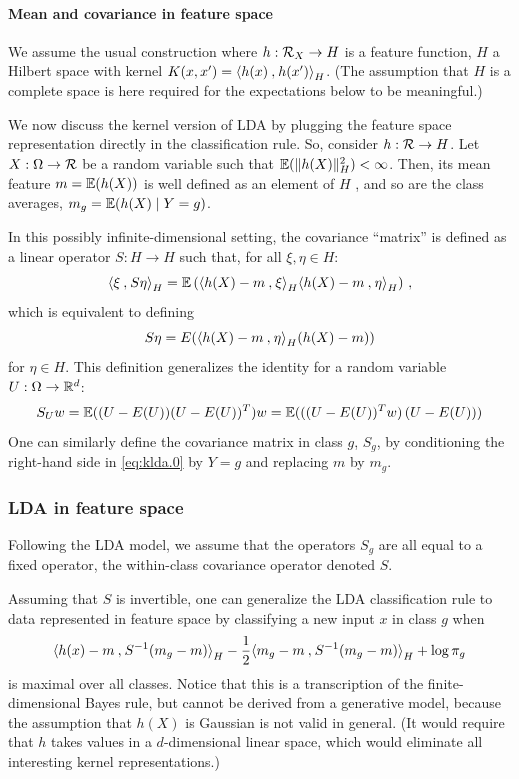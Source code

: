 \paragraph{Mean and covariance in feature space}
We assume the usual construction where $h: {\mathcal R}_X \to H$ is a feature function, $H$ a {Hilbert} space with kernel $K(x,x') = {\langle {h(x)}\mathbin{,} {h(x')}\rangle}_H$. (The assumption that $H$ is a complete space is here required for the expectations below to be meaningful.)

We now discuss the kernel version of LDA by plugging the feature space representation directly in the classification rule. So, consider $h: {\mathcal R} \to H$. Let $X:\Omega \to {\mathcal R}$ be a random variable such that $\bm{\mathbb E}(\|h(X)\|_H^2) < \infty$. Then, its mean feature $m = \bm{\mathbb E}(h(X))$ is well defined as an element of $H$ , and so are the class averages, $m_g = \bm{\mathbb E}(h(X)\mid Y=g)$. 

In this possibly infinite-dimensional setting, 
the covariance ``matrix'' is  defined as a linear operator $S: H\to H$ such that, for all $\xi, \eta\in H$:
\begin{equation}
\label{eq:klda.0}
{\langle {\xi}\mathbin{,} {S\eta}\rangle}_H = \bm{\mathbb E}\left({\langle {h(X)-m}\mathbin{,} {\xi}\rangle}_H{\langle {h(X)-m}\mathbin{,} {\eta}\rangle}_H\right)\,,
\end{equation}
which is equivalent to defining 
\[
S\eta = E({\langle {h(X)-m}\mathbin{,} {\eta}\rangle}_H (h(X) - m))
\] 
for $\eta\in H$.  This definition generalizes the identity for a random variable $U: \Omega\to {\mathbb{R}}^d$:
\[
S_U w = \bm{\mathbb E}((U-E(U))(U-E(U))^T) w = \bm{\mathbb E}(((U-E(U))^Tw)\,(U-E(U))) 
\]
One can similarly define the covariance matrix in class $g$, $S_g$, by conditioning the right-hand side in \cref{eq:klda.0} by $Y=g$ and replacing $m$ by $m_g$. 
\bigskip


\subsubsection*{LDA in feature space}
Following the LDA model, we assume that the operators $S_g$ are all equal to a fixed operator, the within-class  covariance operator denoted $S$.

Assuming that $S$ is invertible, one can generalize the LDA classification rule to data represented in feature space   by classifying a new input $x$ in class $g$ when 
\begin{equation}
\label{eq:klda.1}
{\langle {h(x)- m}\mathbin{,} { S^{-1} (m_g - m)}\rangle}_H - \frac12 {\langle {m_g - m}\mathbin{,} {S^{-1} (m_g- m)}\rangle}_H +  \log\pi_g
\end{equation}
is maximal over all classes. Notice that this is a transcription of the finite-dimensional Bayes rule, but cannot be derived from a generative model, because the assumption that $h(X)$ is Gaussian is not valid in general. (It would require that $h$ takes values in a $d$-dimensional linear space, which would eliminate all interesting kernel representations.)

